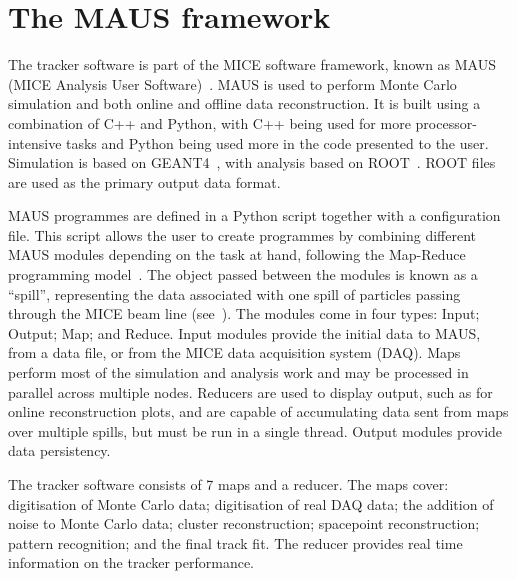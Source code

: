 \section{The MAUS framework}
\label{sec:MAUS}
The tracker software is part of the MICE software framework, known as MAUS (MICE Analysis User Software)~\cite{MausIPAC11}. MAUS is used to perform Monte Carlo simulation and both online and offline data reconstruction. It is built using a combination of C++ and Python, with C++ being used for more processor-intensive tasks and Python being used more in the code presented to the user.  Simulation is based on GEANT4~\cite{GEANT4}, with analysis based on ROOT~\cite{ROOT}.  ROOT files are used as the primary output data format. %

MAUS programmes are defined in a Python script together with a configuration file.  This script allows the user to create programmes by combining different MAUS modules depending on the task at hand, following the Map-Reduce programming model~\cite{MapReduce}. The object passed between the modules is known as a ``spill'', representing the data associated with one spill of particles passing through the MICE beam line (see~\cite{BeamlineJINST}).  The modules come in four types: Input; Output; Map; and Reduce.  Input modules provide the initial data to MAUS, from a data file, or from the MICE data acquisition system (DAQ). Maps perform most of the simulation and analysis work and may be processed in parallel across multiple nodes.  Reducers are used to display output, such as for online reconstruction plots, and are capable of accumulating data sent from maps over multiple spills, but must be run in a single thread. Output modules provide data persistency.

The tracker software consists of 7 maps and a reducer. The maps cover: digitisation of Monte Carlo data; digitisation of real DAQ data; the addition of noise to Monte Carlo data; cluster reconstruction; spacepoint reconstruction; pattern recognition; and the final track fit. The reducer provides real time information on the tracker performance.  %